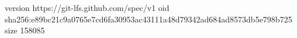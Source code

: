 version https://git-lfs.github.com/spec/v1
oid sha256:e89bc21c9a0765e7cd6fa30953ac43111a48d79342ad684ad8573db5e798b725
size 158085
